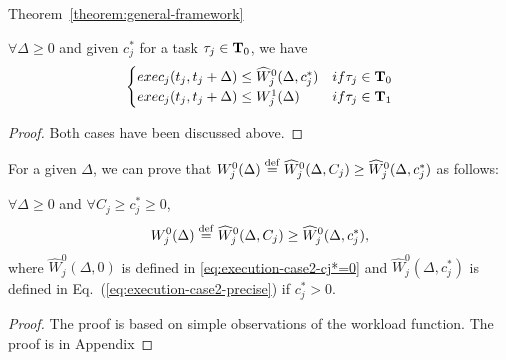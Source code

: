\begin{appProof}{Theorem~\ref{theorem:general-framework}}
\begin{Lemma}
\label{lemma:Wj01-exact}
$\forall \Delta \geq 0$ and given $c_j^*$ for a task $\tau_j \in {\bf T}_0$, we have 
\[
\begin{cases}
exec_j(t_j, t_j+\Delta) \leq \widehat{W}_j^0(\Delta, c_j^*) &\mbox{ if } \tau_j \in {\bf T}_0\\  
exec_j(t_j, t_j+\Delta) \leq W_j^1(\Delta) &\mbox{ if } \tau_j \in {\bf T}_1  
 \end{cases}
\]
\end{Lemma}
\begin{proof}
  Both cases have been discussed above.
\end{proof}
For a given $\Delta$, we can prove that $W_j^0(\Delta)\equals \widehat{W}_j^0(\Delta, C_j) \geq \widehat{W}_j^0(\Delta, c_j^*)$ as follows:
\begin{Lemma}
\label{lemma:Wj0-dominate}
$\forall \Delta \geq 0$ and $\forall C_j\geq c_j^* \geq 0$,
\[
W_j^0(\Delta)\equals \widehat{W}_j^0(\Delta, C_j)  \geq \widehat{W}_j^0(\Delta, c_j^*),
\]
where $\widehat{W}_j^0(\Delta, 0)$ is defined in \eqref{eq:execution-case2-cj*=0}  and
$\widehat{W}_j^0(\Delta, c_j^*)$ is defined in Eq.~(\ref{eq:execution-case2-precise}) if $c_j^* > 0$.
\end{Lemma}
\begin{proof}
 The proof is based on simple observations of the workload function. The proof is in Appendix
\end{proof}





\end{appProof}
